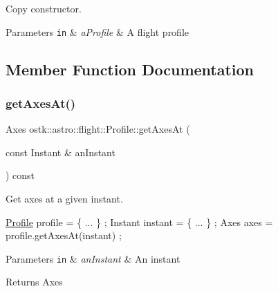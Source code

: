 Copy constructor. 


\begin{DoxyParams}[1]{Parameters}
\mbox{\tt in}  & {\em a\+Profile} & A flight profile \\
\hline
\end{DoxyParams}


\subsection{Member Function Documentation}
\mbox{\label{classostk_1_1astro_1_1flight_1_1_profile_a04d4ef9a89d42586e8a782d1af9ee031}} 
\subsubsection{\texorpdfstring{get\+Axes\+At()}{getAxesAt()}}
{\footnotesize\ttfamily Axes ostk\+::astro\+::flight\+::\+Profile\+::get\+Axes\+At (\begin{DoxyParamCaption}\item[{const Instant \&}]{an\+Instant }\end{DoxyParamCaption}) const}



Get axes at a given instant. 


\begin{DoxyCode}
\hyperlink{classostk_1_1astro_1_1flight_1_1_profile_a09d523b4a58db0d8cc082b4a4d1418a7}{Profile} profile = \{ ... \} ;
Instant instant = \{ ... \} ;
Axes axes = profile.getAxesAt(instant) ;
\end{DoxyCode}



\begin{DoxyParams}[1]{Parameters}
\mbox{\tt in}  & {\em an\+Instant} & An instant \\
\hline
\end{DoxyParams}
\begin{DoxyReturn}{Returns}
Axes 
\end{DoxyReturn}
\mbox{\label{classostk_1_1astro_1_1flight_1_1_profile_abc2383de781cf911f4c275a5d02f3311}} 
